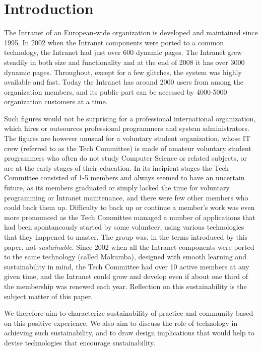 \documentclass{acm_proc_article-sp}
\begin{document}

\section{Introduction}\label{sec:introduction}
The Intranet of an European-wide organization is developed and maintained since 1995. In 2002 when the Intranet components were ported to a common technology, the Intranet had just over 600 dynamic pages. The Intranet grew steadily in both size and functionality
 and at the end of 2008 it has over 3000 dynamic pages. Throughout, except for a few glitches, the system was highly available and fast. Today the Intranet has around 2000 users from among the organization members, and its public part can be accessed by 4000-5000 organization customers at a time.

Such figures would not be surprising for a professional international organization, which hires or outsources professional programmers and system administrators. The figures are however unusual for a voluntary student organization, whose IT crew (referred to as the Tech Committee) is made of amateur voluntary student programmers who often do not study Computer Science or related subjects, or are at the early stages of their education.  In its incipient stages the Tech Committee consisted of 1-5 members and always seemed to have an uncertain future, as its members graduated or simply lacked the time for voluntary programming or Intranet maintenance, and there were few other members who could back them up. Difficulty to back up or continue a member's work was even more pronounced as the Tech Committee managed a number of applications that had been spontaneously started by some volunteer, using various technologies that they happened to master. The group was, in the terms introduced by this paper, not {\it sustainable}.  Since 2002 when all the Intranet components were ported to the same technology (called Makumba), designed with smooth learning and sustainability in mind, the Tech Committee had over 10 active members at any given time, and the Intranet could grow and develop even if about one third of the membership was renewed each year. Reflection on this sustainability is the subject matter of this paper.

We therefore aim to characterize sustainability of practice and community based on this positive experience. We also aim to discuss the role of technology in achieving such sustainability, and to draw design implications that would help to devise technologies that encourage sustainability. 
\end{document}
